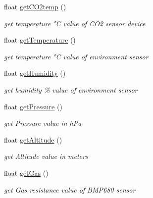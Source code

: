 \begin{DoxyCompactItemize}
\mbox{\label{classSensors_a7afb5c201c4e1933c96719e632181f71}} 
float \hyperlink{classSensors_a7afb5c201c4e1933c96719e632181f71}{get\+C\+O2temp} ()
\begin{DoxyCompactList}\small\item\em get temperature °C value of C\+O2 sensor device \end{DoxyCompactList}\item 
\mbox{\label{classSensors_ac4c22766994b94a2a28158ed72dc4a0c}} 
float \hyperlink{classSensors_ac4c22766994b94a2a28158ed72dc4a0c}{get\+Temperature} ()
\begin{DoxyCompactList}\small\item\em get temperature °C value of environment sensor \end{DoxyCompactList}\item 
\mbox{\label{classSensors_a255bf73cd4afaf6c656dbbcabb1a8bb1}} 
float \hyperlink{classSensors_a255bf73cd4afaf6c656dbbcabb1a8bb1}{get\+Humidity} ()
\begin{DoxyCompactList}\small\item\em get humidity \% value of environment sensor \end{DoxyCompactList}\item 
\mbox{\label{classSensors_a3db568a0fb294fd02cc1f95943db4f55}} 
float \hyperlink{classSensors_a3db568a0fb294fd02cc1f95943db4f55}{get\+Pressure} ()
\begin{DoxyCompactList}\small\item\em get Pressure value in h\+Pa \end{DoxyCompactList}\item 
\mbox{\label{classSensors_ade9951fe566a8fc38dc4b6f4161361d8}} 
float \hyperlink{classSensors_ade9951fe566a8fc38dc4b6f4161361d8}{get\+Altitude} ()
\begin{DoxyCompactList}\small\item\em get Altitude value in meters \end{DoxyCompactList}\item 
\mbox{\label{classSensors_a6051b0aa681611fe040ea0cc7417ef90}} 
float \hyperlink{classSensors_a6051b0aa681611fe040ea0cc7417ef90}{get\+Gas} ()
\begin{DoxyCompactList}\small\item\em get Gas resistance value of B\+M\+P680 sensor \end{DoxyCompactList}\item 

\end{DoxyCompactItemize}
